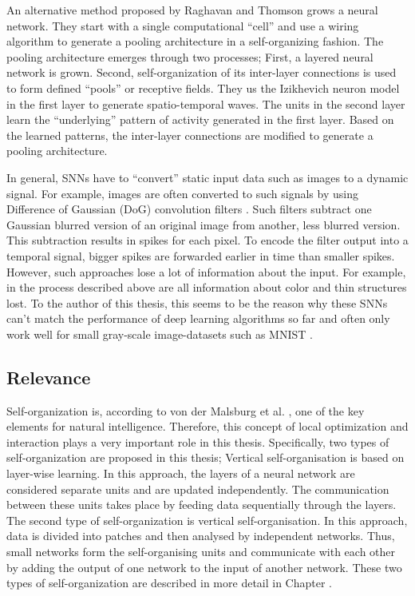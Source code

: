An alternative method proposed by Raghavan and Thomson  grows a neural network.
They start with a single computational ``cell'' and use a wiring algorithm to generate a pooling architecture in a self-organizing fashion.
The pooling architecture emerges through two processes; First, a layered neural network is grown. Second, self-organization of its inter-layer connections is used to form defined ``pools'' or receptive fields.
They us the Izikhevich neuron model  in the first layer to generate spatio-temporal waves.
The units in the second layer learn the ``underlying'' pattern of activity generated in the first layer. 
Based on the learned patterns, the inter-layer connections are modified to generate a pooling architecture.

In general, SNNs have to ``convert'' static input data such as images to a dynamic signal.
For example, images are often converted to such signals by using Difference of Gaussian (DoG) convolution filters .
Such filters subtract one Gaussian blurred version of an original image from another, less blurred version.
This subtraction results in spikes for each pixel.
To encode the filter output into a temporal signal, bigger spikes are forwarded earlier in time than smaller spikes.
However, such approaches lose a lot of information about the input.
For example, in the process described above are all information about color and thin structures lost.
To the author of this thesis, this seems to be the reason why these SNNs can't match the performance of deep learning algorithms so far and often only work well for small gray-scale image-datasets such as MNIST \cite{Lecun_Bottou_Bengio_Haffner_1998}.

\subsection{Relevance}
Self-organization is, according to von der Malsburg et al. , one of the key elements for natural intelligence.
Therefore, this concept of local optimization and interaction plays a very important role in this thesis.
Specifically, two types of self-organization are proposed in this thesis;
Vertical self-organisation is based on layer-wise learning. In this approach, the layers of a neural network are considered separate units and are updated independently.
The communication between these units takes place by feeding data sequentially through the layers.
The second type of self-organization is vertical self-organisation. In this approach, data is divided into patches and then analysed by independent networks. Thus, small networks form the self-organising units and communicate with each other by adding the output of one network to the input of another network.
These two types of self-organization are described in more detail in Chapter .


